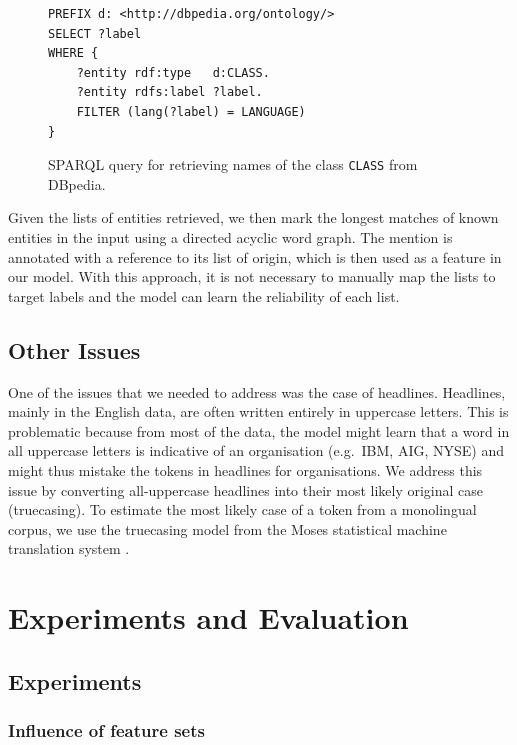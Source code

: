 \documentclass[11pt]{article}
\begin{document}
\begin{figure}
\begin{verbatim}
PREFIX d: <http://dbpedia.org/ontology/>
SELECT ?label
WHERE {
    ?entity rdf:type   d:CLASS.
    ?entity rdfs:label ?label.
    FILTER (lang(?label) = LANGUAGE)
}
\end{verbatim}
\caption{SPARQL query for retrieving names of the class \texttt{CLASS} from DBpedia.}
\label{fig:sparql}

\end{figure}

Given the lists of entities retrieved, we then mark the longest matches of known entities in the input using a directed acyclic word graph. 
The mention is annotated with a reference to its list of origin, which is then used as a feature in our model. With this approach, it is not 
necessary to manually map the lists to target labels and the model can learn the reliability of each list.


\subsection{Other Issues}

One of the issues that we needed to address was the case of headlines. Headlines, mainly in the English data, are often written entirely 
in uppercase letters. This is problematic because from most of the data, the model might learn that a word in all uppercase letters is 
indicative of an organisation (e.g.\ IBM, AIG, NYSE) and might thus mistake the tokens in headlines for organisations. 
We address this issue by converting all-uppercase headlines into their most likely original case (truecasing). 
To estimate the most likely case of a token from a monolingual corpus, we use the truecasing model from the 
Moses statistical machine translation system \cite{koehn2007moses}. 





\section{Experiments and Evaluation}

\subsection{Experiments}

\subsubsection{Influence of feature sets}
\end{document}
